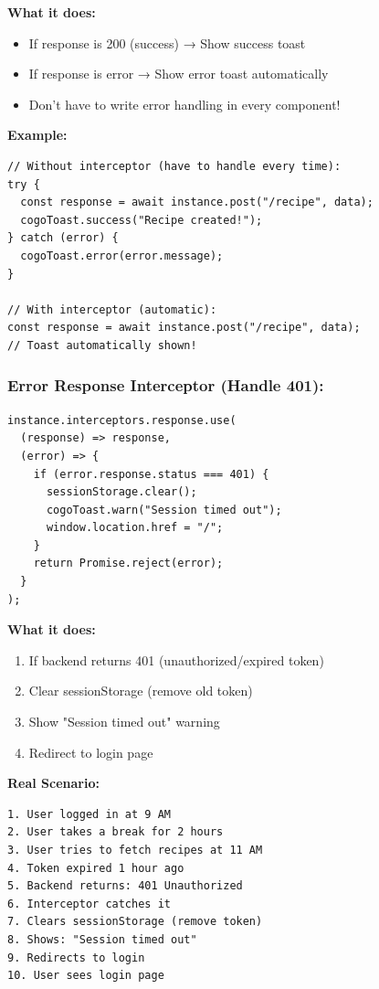 \documentclass[12pt]{article}
\begin{document}
\textbf{What it does:}

\begin{itemize}
    \item If response is 200 (success) → Show success toast
    \item If response is error → Show error toast automatically
    \item Don't have to write error handling in every component!
\end{itemize}

\textbf{Example:}

\begin{lstlisting}
// Without interceptor (have to handle every time):
try {
  const response = await instance.post("/recipe", data);
  cogoToast.success("Recipe created!");
} catch (error) {
  cogoToast.error(error.message);
}

// With interceptor (automatic):
const response = await instance.post("/recipe", data);
// Toast automatically shown!
\end{lstlisting}

\subsubsection*{Error Response Interceptor (Handle 401):}

\begin{lstlisting}
instance.interceptors.response.use(
  (response) => response,
  (error) => {
    if (error.response.status === 401) {
      sessionStorage.clear();
      cogoToast.warn("Session timed out");
      window.location.href = "/";
    }
    return Promise.reject(error);
  }
);
\end{lstlisting}

\textbf{What it does:}

\begin{enumerate}
    \item If backend returns 401 (unauthorized/expired token)
    \item Clear sessionStorage (remove old token)
    \item Show "Session timed out" warning
    \item Redirect to login page
\end{enumerate}

\textbf{Real Scenario:}

\begin{lstlisting}
1. User logged in at 9 AM
2. User takes a break for 2 hours
3. User tries to fetch recipes at 11 AM
4. Token expired 1 hour ago
5. Backend returns: 401 Unauthorized
6. Interceptor catches it
7. Clears sessionStorage (remove token)
8. Shows: "Session timed out"
9. Redirects to login
10. User sees login page
\end{lstlisting}
\end{document}
